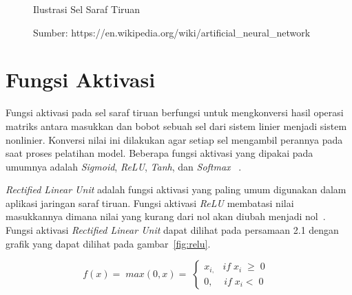 \begin{figure}[htbp]
    \begin{center}
    \end{center}
    \vspace{-20pt}
    \captionsetup{labelfont=bf, textfont=bf}
    \caption{Ilustrasi Sel Saraf Tiruan}
    \vspace{-10pt}
    \captionsetup{labelfont=md, textfont=md}
    \caption*{Sumber: https://en.wikipedia.org/wiki/artificial\_neural\_network}
    \label{fig:saraftiruan}
\end{figure}

\pagebreak

\section{Fungsi Aktivasi}
\label{sec:2-FungsiAktivasi}

Fungsi aktivasi pada sel saraf tiruan berfungsi untuk mengkonversi hasil operasi matriks antara
masukkan dan bobot sebuah sel dari sistem linier menjadi sistem nonlinier. Konversi nilai ini dilakukan
agar setiap sel mengambil perannya pada saat proses pelatihan model. Beberapa fungsi aktivasi yang
dipakai pada umumnya adalah \textit{Sigmoid}, \textit{ReLU}, \textit{Tanh}, dan \textit{Softmax}
~\cite{2014arXiv1412.6830A}.

\textit{Rectified Linear Unit} adalah fungsi aktivasi yang paling umum digunakan dalam aplikasi
jaringan saraf tiruan. Fungsi aktivasi \textit{ReLU} membatasi nilai masukkannya dimana nilai yang
kurang dari nol akan diubah menjadi nol~\cite{Hinton_rectifiedlinear, 2018arXiv181103378N}.
Fungsi aktivasi \textit{Rectified Linear Unit} dapat dilihat pada persamaan 2.1 dengan grafik yang
dapat dilihat pada gambar~\ref{fig:relu}.

\begin{equation}
    \;f(x)=\;max\left(0,x\right)=\;\left\{\begin{array}{l}x_{i,\;}\;\;if\;x_i\;\geq\;0\\0,\;\;\;\;if\;x_i<\;0\;\;\end{array}\right.\;\;
\end{equation}

